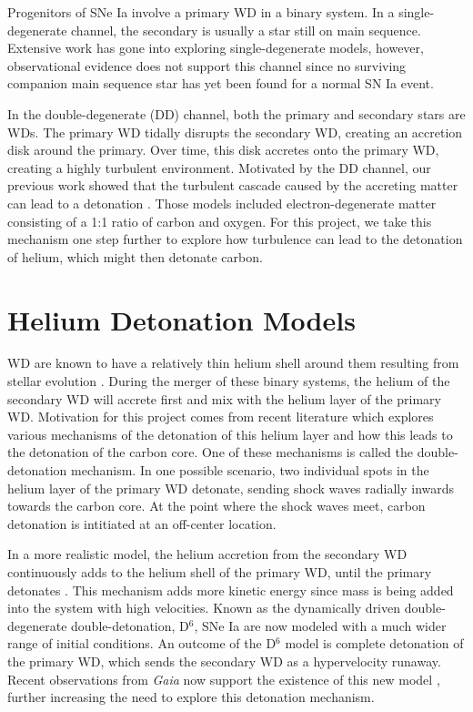 \documentclass{aastex63}
\begin{document}
Progenitors of SNe Ia involve a primary WD in a binary system. In a single-degenerate channel, the secondary is usually a star still on main sequence. Extensive work has gone into exploring single-degenerate models, however, observational evidence does not support this channel since no surviving companion main sequence star has yet been found for a normal SN Ia event.

In the double-degenerate (DD) channel, both the primary and secondary stars are WDs. The primary WD tidally disrupts the secondary WD, creating an accretion disk around the primary. Over time, this disk accretes onto the primary WD, creating a highly turbulent environment. Motivated by the DD channel, our previous work showed that the turbulent cascade caused by the accreting matter can lead to a detonation \cite{Fisher}. Those models included electron-degenerate matter consisting of a 1:1 ratio of carbon and oxygen. For this project, we take this mechanism one step further to explore how turbulence can lead to the detonation of helium, which might then detonate carbon.


\section{Helium Detonation Models} \label{sec:floats}

WD are known to have a relatively thin helium shell around them resulting from stellar evolution \cite{giammichele}. During the merger of these binary systems, the helium of the secondary WD will accrete first and mix with the helium layer of the primary WD. Motivation for this project comes from recent literature which explores various mechanisms of the detonation of this helium layer and how this leads to the detonation of the carbon core. One of these mechanisms is called the double-detonation mechanism. In one possible scenario, two individual spots in the helium layer of the primary WD detonate, sending shock waves radially inwards towards the carbon core. At the point where the shock waves meet, carbon detonation is intitiated at an off-center location.

In a more realistic model, the helium accretion from the secondary WD continuously adds to the helium shell of the primary WD, until the primary detonates \cite{Shen}. This mechanism adds more kinetic energy since mass is being added into the system with high velocities. Known as the dynamically driven double-degenerate double-detonation, D$^6$, SNe Ia are now modeled with a much wider range of initial conditions. An outcome of the D$^6$ model is complete detonation of the primary WD, which sends the secondary WD as a hypervelocity runaway. Recent observations from \textit{Gaia} now support the existence of this new model \cite{Gaia}, further increasing the need to explore this detonation mechanism.
\end{document}
